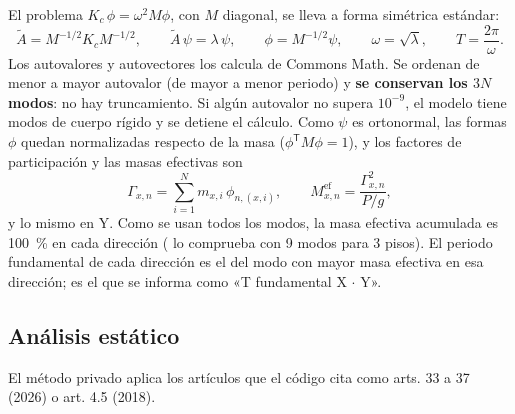El problema $K_c\,\phi = \omega^2 M \phi$, con $M$ diagonal, se lleva a forma simétrica estándar:
\begin{equation}
	\tilde{A} = M^{-1/2} K_c M^{-1/2}, \qquad \tilde{A}\,\psi = \lambda\,\psi, \qquad
	\phi = M^{-1/2}\psi, \qquad \omega = \sqrt{\lambda}, \qquad T = \frac{2\pi}{\omega} .
	\label{eq:sis-modos}
\end{equation}
Los autovalores y autovectores los calcula  de Commons Math. Se ordenan de menor a mayor
autovalor (de mayor a menor periodo) y \textbf{se conservan los $3N$ modos}: no hay truncamiento. Si algún autovalor
no supera $10^{-9}$, el modelo tiene modos de cuerpo rígido y se detiene el cálculo. Como $\psi$ es ortonormal, las
formas $\phi$ quedan normalizadas respecto de la masa ($\phi^{\mathsf{T}} M \phi = 1$), y los factores de participación y
las masas efectivas son
\begin{equation}
	\Gamma_{x,n} = \sum_{i=1}^{N} m_{x,i}\,\phi_{n,(x,i)}, \qquad
	M^{\text{ef}}_{x,n} = \frac{\Gamma_{x,n}^2}{P/g},
	\label{eq:sis-masaefectiva}
\end{equation}
y lo mismo en Y. Como se usan todos los modos, la masa efectiva acumulada es 100~\% en cada dirección
( lo comprueba con 9 modos para 3 pisos). El periodo fundamental de cada dirección es el del modo con
mayor masa efectiva en esa dirección; es el que se informa como «T fundamental X $\cdot$ Y».

\subsection{Análisis estático}
\label{sec:sis-estatico}

El método privado  aplica los artículos que el código cita como arts. 33 a 37 (2026) o art. 4.5 (2018).

